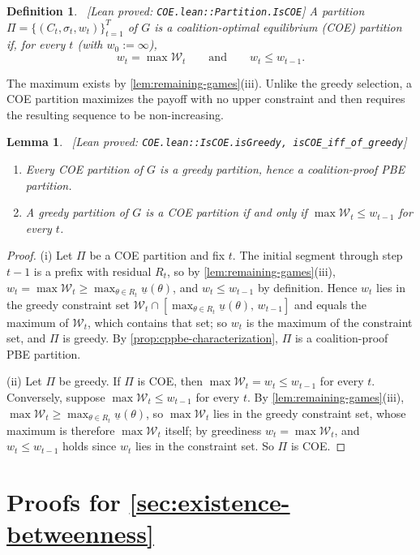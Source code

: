 \documentclass[11pt]{article}
\newtheorem{lemma}{Lemma}
\newtheorem{definition}{Definition}
\newcommand{\W}{\mathcal{W}}
\newcommand{\leanproved}[1]{{\footnotesize\textsf{\textcolor{green!55!black}{[Lean proved: \texttt{#1}]}}}}
\begin{document}
\begin{definition}\label{dfn:coe}\ \leanproved{COE.lean::Partition.IsCOE}
    A partition $\Pi=\{(C_t,\sigma_t,w_t)\}_{t=1}^T$ of $G$ is a \emph{coalition-optimal equilibrium} (COE) partition if, for every $t$ (with $w_0:=\infty$),
    \[
        w_t=\max\W_t
        \qquad\text{and}\qquad
        w_t\leq w_{t-1}.
    \]
\end{definition}

The maximum exists by \cref{lem:remaining-games}(iii). Unlike the greedy selection, a COE partition maximizes the payoff with no upper constraint and then requires the resulting sequence to be non-increasing.

\begin{lemma}\label{lem:coe-greedy}\ \leanproved{COE.lean::IsCOE.isGreedy,\ isCOE\_iff\_of\_greedy}
    \begin{enumerate}
        \item[(i)] Every COE partition of $G$ is a greedy partition, hence a coalition-proof PBE partition.
        \item[(ii)] A greedy partition of $G$ is a COE partition if and only if $\max\W_t\leq w_{t-1}$ for every $t$.
    \end{enumerate}
\end{lemma}
\begin{proof}
    (i) Let $\Pi$ be a COE partition and fix $t$. The initial segment through step $t-1$ is a prefix with residual $R_t$, so by \cref{lem:remaining-games}(iii), $w_t=\max\W_t\geq\max_{\theta\in R_t}\underline{u}(\theta)$, and $w_t\leq w_{t-1}$ by definition. Hence $w_t$ lies in the greedy constraint set $\W_t\cap[\max_{\theta\in R_t}\underline{u}(\theta),\,w_{t-1}]$ and equals the maximum of $\W_t$, which contains that set; so $w_t$ is the maximum of the constraint set, and $\Pi$ is greedy. By \cref{prop:cppbe-characterization}, $\Pi$ is a coalition-proof PBE partition.

    (ii) Let $\Pi$ be greedy. If $\Pi$ is COE, then $\max\W_t=w_t\leq w_{t-1}$ for every $t$. Conversely, suppose $\max\W_t\leq w_{t-1}$ for every $t$. By \cref{lem:remaining-games}(iii), $\max\W_t\geq\max_{\theta\in R_t}\underline{u}(\theta)$, so $\max\W_t$ lies in the greedy constraint set, whose maximum is therefore $\max\W_t$ itself; by greediness $w_t=\max\W_t$, and $w_t\leq w_{t-1}$ holds since $w_t$ lies in the constraint set. So $\Pi$ is COE.
\end{proof}

\section{Proofs for \cref{sec:existence-betweenness}}
\end{document}
